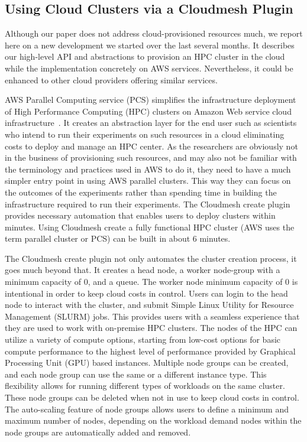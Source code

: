 \documentclass[utf8]{FrontiersinVancouver} %
\begin{document}
\subsection{Using Cloud Clusters via a Cloudmesh Plugin}
\label{sec:cloudcluster}

Although our paper does not address cloud-provisioned resources much, we report here on a new development we started over the last several months. It describes our high-level API and abstractions to provision an HPC cluster in the cloud while the implementation concretely on AWS services. Nevertheless, it could be enhanced to other cloud providers offering similar services.

AWS Parallel Computing service (PCS) simplifies the infrastructure deployment of High Performance Computing (HPC) clusters on Amazon Web service cloud infrastructure~\citep{awspcs:online}. It creates an abstraction layer for the end user such as scientists who intend to run their experiments on such resources in a cloud eliminating costs to deploy and manage an HPC center. As the researchers are obviously not in the business of provisioning such resources, and may also not be familiar with the terminology and practices used in AWS to do it, they need to have a much simpler entry point in using AWS parallel clusters.
This way they can focus on the outcomes of the experiments rather than spending time in building the infrastructure required to run their experiments. The Cloudmesh create plugin provides necessary automation that enables users to deploy clusters within minutes. Using Cloudmesh create a fully functional HPC cluster  (AWS uses the term parallel cluster or PCS) can be built in about 6 minutes. 

The Cloudmesh create plugin not only automates the cluster creation process, it goes much beyond that. It creates a head node, a worker node-group with a minimum capacity of 0, and a queue. The worker node minimum capacity of 0 is intentional in order to keep cloud costs in control. Users can login to the head node to interact with the cluster, and submit Simple Linux Utility for Resource Management (SLURM) jobs. This provides users with a seamless experience that they are used to work with on-premise HPC clusters. The nodes of the HPC can utilize a variety of compute options, starting from low-cost options for basic compute performance to the highest level of performance provided by Graphical Processing Unit (GPU) based instances. Multiple node groups can be created, and each node group can use the same or a different instance type. This flexibility allows for running different types of workloads on the same cluster. These node groups can be deleted when not in use to keep cloud costs in control. The auto-scaling feature of node groups allows users to define a minimum and maximum number of nodes, depending on the workload demand nodes within the node groups are automatically added and removed.
\end{document}
